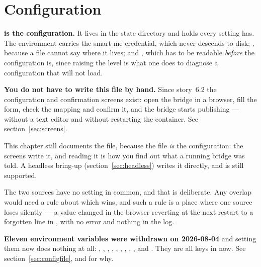 \chapter{Configuration}
\label{ch:config}

\textbf{ is the configuration.} It lives in the state directory and holds
every setting \prog has. The environment carries the smart-me credential, which never
descends to disk; , because a file cannot say where it lives; and
, which has to be readable \emph{before} the configuration is, since raising
the level is what one does to diagnose a configuration that will not load.

\begin{note}
\textbf{You do not have to write this file by hand.} Since story~6.2 the configuration and
confirmation screens exist: open the bridge in a browser, fill the form, check the mapping
and confirm it, and the bridge starts publishing --- without a text editor and without
restarting the container. See section~\ref{sec:screens}.

This chapter still documents the file, because the file \emph{is} the configuration: the
screens write it, and reading it is how you find out what a running bridge was told. A
headless bring-up (section~\ref{sec:headless}) writes it directly, and is still supported.
\end{note}

The two sources have no setting in common, and that is deliberate. Any overlap would need
a rule about which wins, and such a rule is a place where one source loses silently ---
a value changed in the browser reverting at the next restart to a forgotten line in
, with no error and nothing in the log.

\begin{warning}
\textbf{Eleven environment variables were withdrawn on 2026-08-04} and setting them now
does nothing at all: , ,
, , ,
, , ,
,  and . They are
all keys in  now. See section~\ref{sec:configfile}, and
for why.
\end{warning}

